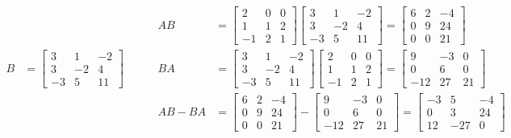 \documentclass[twoside]{amsart}
\theoremstyle{plain}
\theoremstyle{definition}
\begin{document}
\begin{enumerate}
\[\begin{aligned}
  B & = \left[ \begin{matrix} 3 & 1 & -2 \\ 3 & -2 & 4 \\ -3 & 5 & 11 \end{matrix} \right]
\end{aligned} \quad \quad \,  \begin{aligned} AB & = \left[ \begin{matrix} 2 & 0 & 0 \\ 1 & 1 & 2 \\ -1 & 2 & 1 \end{matrix} \right] \left[ \begin{matrix} 3 & 1 & -2 \\ 3 & -2 & 4 \\ -3 & 5 & 11 \end{matrix} \right] = \left[ \begin{matrix} 6 & 2 & -4 \\ 0 & 9 & 24 \\ 0 & 0 & 21 \end{matrix} \right] \\
  BA & = \left[ \begin{matrix} 3 & 1 & -2 \\ 3 & -2 & 4 \\ -3 & 5 & 11 \end{matrix} \right]\left[ \begin{matrix} 2 & 0 & 0 \\ 1 & 1 & 2 \\ -1 & 2 & 1 \end{matrix} \right] = \left[ \begin{matrix} 9 & -3 & 0 \\ 0 & 6 & 0 \\ -12 & 27 & 21 \end{matrix} \right] \\
  AB - BA & = \left[ \begin{matrix} 6 & 2 & -4 \\ 0 & 9 & 24 \\ 0 & 0 & 21 \end{matrix} \right] - \left[ \begin{matrix} 9 & -3 & 0 \\ 0 &  6 & 0  \\ -12 & 27 & 21 \end{matrix} \right] = \left[ \begin{matrix} -3 & 5 & -4 \\ 0 & 3 & 24 \\ 12 & -27 & 0 \end{matrix} \right] \end{aligned} \] 
\end{enumerate}
\end{document}

